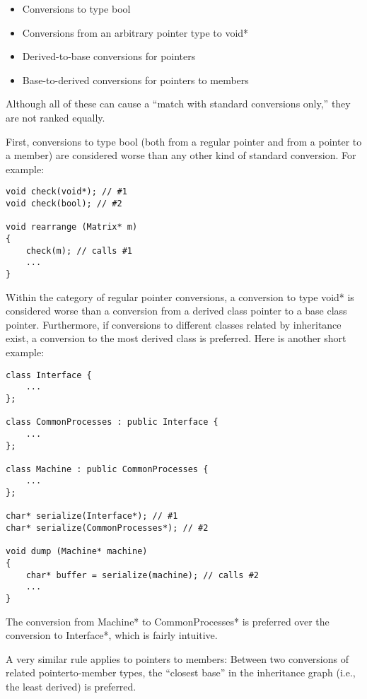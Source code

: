 \begin{itemize}
\item 
Conversions to type bool

\item 
Conversions from an arbitrary pointer type to void*

\item 
Derived-to-base conversions for pointers

\item 
Base-to-derived conversions for pointers to members
\end{itemize}

Although all of these can cause a “match with standard conversions only,” they are not ranked equally.

First, conversions to type bool (both from a regular pointer and from a pointer to a member) are considered worse than any other kind of standard conversion. For example:

\begin{lstlisting}[style=styleCXX]
void check(void*); // #1
void check(bool); // #2

void rearrange (Matrix* m)
{
	check(m); // calls #1
	...
}
\end{lstlisting}

Within the category of regular pointer conversions, a conversion to type void* is considered worse than a conversion from a derived class pointer to a base class pointer. Furthermore, if conversions to different classes related by inheritance exist, a conversion to the most derived class is preferred. Here is another short example:

\begin{lstlisting}[style=styleCXX]
class Interface {
	...
};

class CommonProcesses : public Interface {
	...
};

class Machine : public CommonProcesses {
	...
};

char* serialize(Interface*); // #1
char* serialize(CommonProcesses*); // #2

void dump (Machine* machine)
{
	char* buffer = serialize(machine); // calls #2
	...
}
\end{lstlisting}

The conversion from Machine* to CommonProcesses* is preferred over the conversion to Interface*, which is fairly intuitive.

A very similar rule applies to pointers to members: Between two conversions of related pointerto-member types, the “closest base” in the inheritance graph (i.e., the least derived) is preferred.

